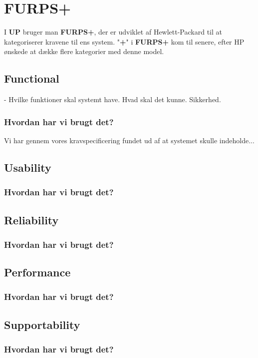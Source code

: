 \section{FURPS+}
I \textbf{UP} bruger man \textbf{FURPS+}, der er udviklet af Hewlett-Packard til at kategoriserer kravene til ens system. "\textbf{+}" i \textbf{FURPS+} kom til senere, efter HP ønskede at dække flere kategorier med denne model.
\subsection{Functional}
- Hvilke funktioner skal systemt have. Hvad skal det kunne. Sikkerhed.
\subsubsection{Hvordan har vi brugt det?}
Vi har gennem vores kravspecificering fundet ud af at systemet skulle indeholde...
\subsection{Usability}

\subsubsection{Hvordan har vi brugt det?}
\subsection{Reliability}
\subsubsection{Hvordan har vi brugt det?}
\subsection{Performance}
\subsubsection{Hvordan har vi brugt det?}
\subsection{Supportability}
\subsubsection{Hvordan har vi brugt det?}

